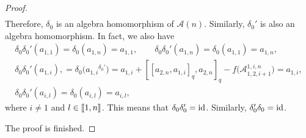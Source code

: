 \documentclass[10pt,a4paper]{amsart}
\numberwithin{equation}{section}
\def\lrb#1{\left(#1\right)}
\def\d{\delta}
\def\A{\mathscr{A}}
\def\lbb#1{\left[\kern-0.15em\left[ {#1} \right] \kern-0.15em\right]}
\begin{document}
\begin{proof}
\begin{gather*}
\end{gather*}
Therefore, $\d_0$ is an algebra homomorphism of $\A(n)$.
Similarly, $\d_0'$ is also an algebra homomorphism.
In fact, we also have
\begin{gather*}
\d_0\d_0'\lrb{a_{1,1}} = \d_0\lrb{a_{1,n}}=a_{1,1},\qquad
\d_0\d_0'\lrb{a_{1,n}} = \d_0\lrb{a_{1,1}}=a_{1,n},\\
\d_0\d_0'\lrb{a_{1,i}},
 = \d_0\bigl({a_{1,i}}^{\d_0'}\bigr)=a_{1,i}+[[a_{2,n}, a_{1,i}]_q, a_{2,n}]_q -f\bigl(\A_{1,2,i+1}^{1,i,n}\bigr)
=a_{1,i},\\
\d_0\d_0'\lrb{a_{i,l}} = \d_0\lrb{a_{i,l}}=a_{i,l},
\end{gather*}
where $i \neq 1$ and $l \in \lbb{1,n}$.
This means that $\d_0\d_0'={\rm id}$.
Similarly, $\d_0'\d_0={\rm id}$.

 The proof is finished.
\end{proof}
\end{document}
